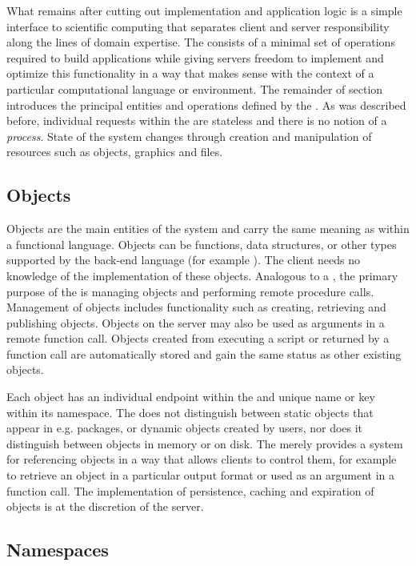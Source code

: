 What remains after cutting out implementation and application logic is a simple interface to scientific computing that separates client and server responsibility along the lines of domain expertise. The \OpenCPU \API consists of a minimal set of operations required to build applications while giving servers freedom to implement and optimize this functionality in a way that makes sense with the context of a particular computational language or environment. The remainder of section introduces the principal entities and operations defined by the \API. As was described before, individual requests within the \OpenCPU \API are stateless and there is no notion of a \emph{process}. State of the system changes through creation and manipulation of resources such as objects, graphics and files. 

\subsection{Objects}

Objects are the main entities of the system and carry the same meaning as within a functional language. Objects can be functions, data structures, or other types supported by the back-end language (for example \R). The client needs no knowledge of the implementation of these objects. Analogous to a \CLI, the primary purpose of the \API is managing objects and performing remote procedure calls. Management of objects includes functionality such as creating, retrieving and publishing objects. Objects on the server may also be used as arguments in a remote function call. Objects created from executing a script or returned by a function call are automatically stored and gain the same status as other existing objects.

Each object has an individual endpoint within the \API and unique name or key within its namespace. The \API does not distinguish between static objects that appear in e.g. packages, or dynamic objects created by users, nor does it distinguish between objects in memory or on disk. The \API merely provides a system for referencing objects in a way that allows clients to control them, for example to retrieve an object in a particular output format or used as an argument in a function call. The implementation of persistence, caching and expiration of objects is at the discretion of the server. 

\subsection{Namespaces}

